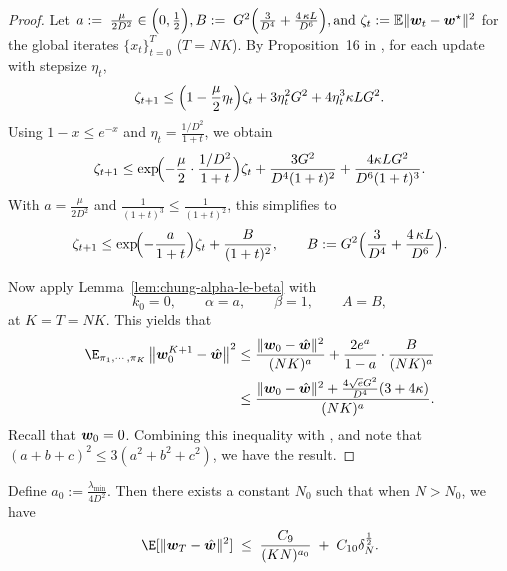     \begin{proof}
    Let $ a:=\; \frac{\mu}{2D^2}\in\Bigl(0,\frac{1}{2}\Bigr), B :=\; G^2\Bigl(\frac{3}{D^4}+\frac{4\,\kappa L}{D^6}\Bigr), \text{and} \ \zeta_t:=\mathbb E\|\vw_t-\vw^\star\|^2$ for the global iterates $\{x_t\}_{t=0}^{T}$ ($T=NK$).
    By Proposition~16 in \citep{ahn2020sgd}, for each update with stepsize $\eta_t$,
    \[
    \zeta_{t+1}
    \le \Bigl(1-\frac{\mu}{2}\eta_t\Bigr)\zeta_t
    +3\eta_t^2G^2+4\eta_t^3\kappa L G^2.
    \]
    Using $1-x\le e^{-x}$ and $\eta_t=\frac{1/D^2}{1+t}$, we obtain
    \[
    \zeta_{t+1}
    \le \exp\!\Bigl(-\frac{\mu}{2}\cdot \frac{1/D^2}{1+t}\Bigr)\zeta_t
    +\frac{3G^2}{D^4(1+t)^2}+\frac{4\kappa L G^2}{D^6(1+t)^3}.
    \]
    With $a=\frac{\mu}{2D^2}$ and $\frac{1}{(1+t)^3}\le \frac{1}{(1+t)^2}$, this simplifies to
    \[
    \zeta_{t+1}
    \le \exp\!\Bigl(-\frac{a}{1+t}\Bigr)\zeta_t
    +\frac{B}{(1+t)^2},
    \qquad
    B:=G^2\Bigl(\frac{3}{D^4}+\frac{4\,\kappa L}{D^6}\Bigr).
    \]
    
    Now apply Lemma~\ref{lem:chung-alpha-le-beta} with
    \[
    k_0=0,\qquad \alpha=a,\qquad \beta=1,\qquad A=B,
    \]
    at $K=T=NK$. This yields that
    \begin{align*}
    \E_{\pi_1, \cdots, \pi_{K}}\left\|\vw_0^{K+1}-\hat{\vw}\right\|^2
    &\le
    \frac{\|\vw_0-\hat{\vw}\|^2}{(NK)^{a}}+
    \frac{2e^{a}}{1-a}\cdot \frac{B}{(NK)^{a}} \\     
    &\le
    \frac{\|\vw_0-\hat{\vw}\|^2+\frac{4\sqrt{e}G^2}{D^4}(3+4\kappa)}{(NK)^{a}}.
    \end{align*}
    Recall that ${\bm{w}}_0 = 0$. Combining this inequality with , and note that $(a+b+c)^2\leq3(a^2+b^2+c^2)$, we have the result.
    \end{proof}
    
        

    \begin{lemma}
\label{lem:bound-RHS-split}

Define $a_0:=\frac{\lambda_{\min}}{4D^2}.$
Then there exists a constant $N_0$ such that when $N>N_0$, we have
\begin{equation}\label{eq:exp-RHS-d}
\E[\|\vw_T-\hat{\vw}\|^2]
\;\le\;
\frac{C_9}
{(KN)^{a_0}}
\;+\;
C_{10}\delta_N^{\frac{1}{2}}.
\end{equation}
\end{lemma}

